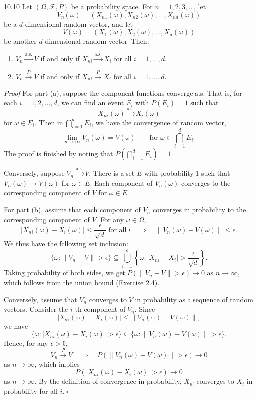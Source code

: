 \begin{thmbox}{10.10}
Let $(\Omega,\mathcal{F},P)$ be a probability space. For $n=1,2,3,\ldots$, let
\[
V_n(\omega)=(X_{n1}(\omega),X_{n2}(\omega),\ldots,X_{nd}(\omega))
\]
be a $d$-dimensional random vector, and let
\[
V(\omega)=(X_1(\omega),X_2(\omega),\ldots,X_d(\omega))
\]
be another $d$-dimensional random vector. Then:
\begin{enumerate}
\item $V_n\xrightarrow{\mathrm{a.s.}}V$ if and only if $X_{ni}\xrightarrow{\mathrm{a.s.}}X_i$ for all $i=1,\ldots,d$.
\item $V_n\xrightarrow{P}V$ if and only if $X_{ni}\xrightarrow{P}X_i$ for all $i=1,\ldots,d$.
\end{enumerate}
\end{thmbox}

\textit{Proof}
For part (a), suppose the component functions converge a.s. That is, for each $i=1,2,\ldots,d$, we can find an event $E_i$ with $P(E_i)=1$ such that
\[
X_{ni}(\omega)\xrightarrow{\mathrm{a.s.}}X_i(\omega)
\]
for $\omega\in E_i$. Then in $\bigcap_{i=1}^{d}E_i$, we have the convergence of random vector,
\[
\lim_{n\to\infty}V_n(\omega)=V(\omega)
\qquad\text{for }\omega\in\bigcap_{i=1}^{d}E_i.
\]
The proof is finished by noting that $P(\bigcap_{i=1}^{d}E_i)=1$.

Conversely, suppose $V_n\xrightarrow{\mathrm{a.s.}}V$. There is a set $E$ with probability $1$ such that $V_n(\omega)\to V(\omega)$ for $\omega\in E$. Each component of $V_n(\omega)$ converges to the corresponding component of $V$ for $\omega\in E$.

For part (b), assume that each component of $V_n$ converges in probability to the corresponding component of $V$. For any $\omega\in\Omega$,
\[
\lvert X_{ni}(\omega)-X_i(\omega)\rvert\leq \frac{\epsilon}{\sqrt{d}}
\text{ for all } i
\quad\Longrightarrow\quad
\lVert V_n(\omega)-V(\omega)\rVert\leq \epsilon.
\]
We thus have the following set inclusion:
\[
\{\omega:\lVert V_n-V\rVert>\epsilon\}
\subseteq
\bigcup_{i=1}^{d}
\left\{\omega:\lvert X_{ni}-X_i\rvert>\frac{\epsilon}{\sqrt{d}}\right\}.
\]
Taking probability of both sides, we get $P(\lVert V_n-V\rVert>\epsilon)\to 0$ as $n\to\infty$, which follows from the union bound (Exercise 2.4).

Conversely, assume that $V_n$ converges to $V$ in probability as a sequence of random vectors. Consider the $i$-th component of $V_n$. Since
\[
\lvert X_{ni}(\omega)-X_i(\omega)\rvert
\leq
\lVert V_n(\omega)-V(\omega)\rVert,
\]
we have
\[
\{\omega:\lvert X_{ni}(\omega)-X_i(\omega)\rvert>\epsilon\}
\subseteq
\{\omega:\lVert V_n(\omega)-V(\omega)\rVert>\epsilon\}.
\]
Hence, for any $\epsilon>0$,
\[
V_n\xrightarrow{P}V
\quad\Longrightarrow\quad
P(\lVert V_n(\omega)-V(\omega)\rVert>\epsilon)\to 0
\]
as $n\to\infty$, which implies
\[
P(\lvert X_{ni}(\omega)-X_i(\omega)\rvert>\epsilon)\to 0
\]
as $n\to\infty$. By the definition of convergence in probability, $X_{ni}$ converges to $X_i$ in probability for all $i$.
\hfill $\square$

